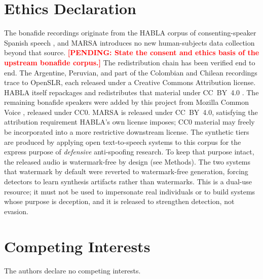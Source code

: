 \documentclass[11pt]{article}
\newcommand{\PENDING}[1]{\textcolor{red}{\textbf{[PENDING: #1]}}}
\begin{document}
\FloatBarrier
\section*{Ethics Declaration}
The bonafide recordings originate from the HABLA corpus of
consenting-speaker Spanish speech \citep{habla}, and MARSA introduces no
new human-subjects data collection beyond that source.
\PENDING{State the consent and ethics basis of the upstream bonafide
corpus.} The redistribution chain has been verified end to end. The
Argentine, Peruvian, and part of the Colombian and Chilean recordings
trace to OpenSLR, each released under a Creative Commons Attribution
license. HABLA itself repackages and redistributes that material under
CC~BY~4.0 \citep{habla}. The remaining bonafide speakers were added by
this project from Mozilla Common Voice \citep{commonvoice}, released
under CC0. MARSA is released under CC~BY~4.0, satisfying the
attribution requirement HABLA's own license imposes; CC0 material may
freely be incorporated into a more restrictive downstream license. The synthetic tiers are produced by applying open
text-to-speech systems to this corpus for the express purpose of
\emph{defensive} anti-spoofing research. To keep that purpose intact,
the released audio is watermark-free by design (see Methods). The two
systems that watermark by default were reverted to watermark-free
generation, forcing detectors to learn synthesis artifacts rather than
watermarks. This is a dual-use resource; it must not be used to
impersonate real individuals or to build systems whose purpose is
deception, and it is released to strengthen detection, not evasion.

\FloatBarrier
\section*{Competing Interests}
The authors declare no competing interests.

\FloatBarrier

\end{document}
